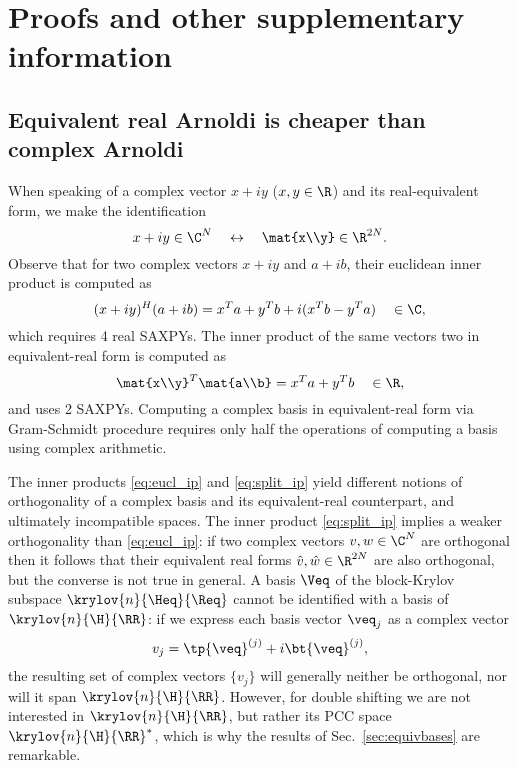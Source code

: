 

\section{Proofs and other supplementary information}

\subsection{Equivalent real Arnoldi is cheaper than complex Arnoldi}
\label{sec:eqrealcheaper}
When speaking of a complex vector $x+iy$ ($x,y\in\R$) and its real-equivalent form,
we make the identification
\[
	 x+iy \in \C^N \quad\leftrightarrow\quad \mat{x\\y}\in\R^{2N}.
\]
Observe that for two complex vectors $x+iy$ and  $a+ib$,
their euclidean inner product is computed as
\begin{equation}
	(x+iy)^H(a+ib) = x^T a + y^T b + i(x^T b - y^T a) \quad \in \C,
\label{eq:eucl_ip}
\end{equation}
which requires 4 real SAXPYs. The inner product of the same
vectors two in equivalent-real form is computed as
\begin{equation}
  	\mat{x\\y}^T \mat{a\\b} = x^T a + y^T b \quad \in \R,
\label{eq:split_ip}
\end{equation}
and uses 2 SAXPYs. Computing a complex basis in equivalent-real form via
Gram-Schmidt procedure requires only half the operations of computing
a basis using complex arithmetic.

The inner products \eqref{eq:eucl_ip} and \eqref{eq:split_ip} yield
different notions of orthogonality of a complex basis
and its equivalent-real counterpart, and ultimately incompatible spaces.  The inner product
\eqref{eq:split_ip} implies a weaker orthogonality than \eqref{eq:eucl_ip}:
if two complex vectors $v,w\in\C^N$ are orthogonal then it follows that their
equivalent real forms $\hat{v},\hat{w}\in\R^{2N}$ are also orthogonal, but the converse
is not true in general.
A basis $\Veq$ of the block-Krylov subspace $\krylov{n}{\Heq}{\Req}$ cannot be
identified with a basis of $\krylov{n}{\H}{\RR}$:  if
we express each basis vector $\veq_j$ as a complex vector
\[
v_j = \tp{\veq}^{(j)} + i\bt{\veq}^{(j)},
\]
the resulting set of complex vectors $\{v_j\}$ will generally neither be orthogonal,
nor will it span $\krylov{n}{\H}{\RR}$.  However, for double shifting we are not interested
in $\krylov{n}{\H}{\RR}$, but rather its PCC space $\krylov{n}{\H}{\RR}^*$,
which is why the results of Sec.~\ref{sec:equivbases} are remarkable.

